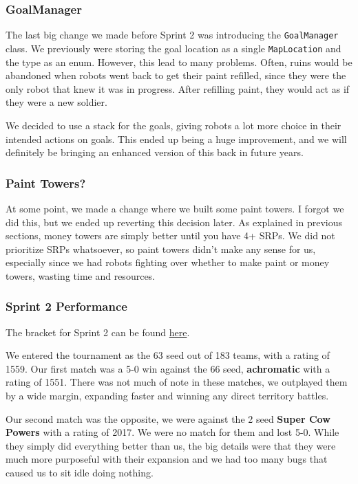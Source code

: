 \subsubsection{GoalManager}

The last big change we made before Sprint 2 was introducing the \verb|GoalManager| class. We previously were storing the goal location as a single \verb|MapLocation| and the type as an enum. However, this lead to many problems. Often, ruins would be abandoned when robots went back to get their paint refilled, since they were the only robot that knew it was in progress. After refilling paint, they would act as if they were a new soldier.

\medskip

We decided to use a stack for the goals, giving robots a lot more choice in their intended actions on goals. This ended up being a huge improvement, and we will definitely be bringing an enhanced version of this back in future years.

\subsubsection{Paint Towers?}

At some point, we made a change where we built some paint towers. I forgot we did this, but we ended up reverting this decision later. As explained in previous sections, money towers are simply better until you have 4+ SRPs. We did not prioritize SRPs whatsoever, so paint towers didn't make any sense for us, especially since we had robots fighting over whether to make paint or money towers, wasting time and resources.

\subsubsection{Sprint 2 Performance}

The bracket for Sprint 2 can be found \href{https://challonge.com/bc25javasprint2}{here}.

\medskip

We entered the tournament as the 63 seed out of 183 teams, with a rating of 1559. Our first match was a 5-0 win against the 66 seed, \textbf{achromatic} with a rating of 1551. There was not much of note in these matches, we outplayed them by a wide margin, expanding faster and winning any direct territory battles.

\medskip

Our second match was the opposite, we were against the 2 seed \textbf{Super Cow Powers} with a rating of 2017. We were no match for them and lost 5-0. While they simply did everything better than us, the big details were that they were much more purposeful with their expansion and we had too many bugs that caused us to sit idle doing nothing.